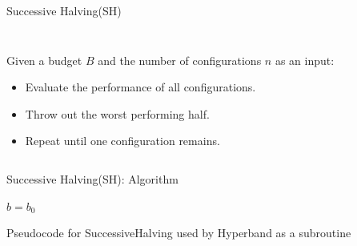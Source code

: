 \begin{frame}{Successive Halving(SH)}
\begin{columns}
\begin{column}{.5\textwidth}
\begin{figure}
\end{figure}
\end{column}
\end{columns}
\vspace{-5em}
\begin{columns}
\begin{column}{.45\textwidth}
Given a budget $B$ and the number of configurations $n$ as an input:
\pause
\begin{itemize}
    \item Evaluate the performance of all configurations.
    \pause
    \item Throw out the worst performing half.
    \pause
    \item Repeat until one configuration remains.

\end{itemize}
\end{column}

\begin{column}{.45\textwidth}
\end{column}

\end{columns}

\end{frame}


\begin{frame}{Successive Halving(SH): Algorithm}
\begin{algorithm}[H]
    \LinesNumbered
    \SetAlgoLined
    \setcounter{AlgoLine}{0}
    \DeclarePairedDelimiter\ceil{\lceil}{\rceil}
    \DeclarePairedDelimiter\floor{\lfloor}{\rfloor}
    \DeclarePairedDelimiter\abs{\lvert}{\rvert}
    
    $b=b_0$\\
    
 
        
    
    \caption{Pseudocode for SuccessiveHalving used by Hyperband as a subroutine}
\end{algorithm}

\end{frame}

